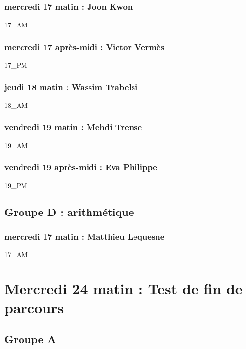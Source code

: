 \documentclass[12pt,A4]{book}
\theoremstyle{definition}
\theoremstyle{thm}
\theoremstyle{def}
\begin{document}
\subsection{mercredi 17 matin : Joon Kwon}

{17_AM}

\subsection{mercredi 17 après-midi : Victor Vermès}

{17_PM}

\subsection{jeudi 18 matin : Wassim Trabelsi}

{18_AM}

\subsection{vendredi 19 matin : Mehdi Trense}

{19_AM}

\subsection{vendredi 19 après-midi : Eva Philippe}

{19_PM}


\section {Groupe D : arithmétique}

\subsection{mercredi 17 matin : Matthieu Lequesne}

{17_AM}

\chapter{Mercredi 24 matin : Test de fin de parcours}
\minitoc \bigskip


\section{Groupe A}
\end{document}
